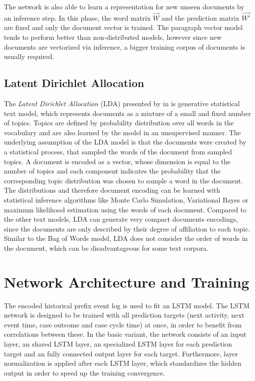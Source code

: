 The network is also able to learn a representation for new unseen documents by an inference step.
In this phase, the word matrix $\vec{W}$ and the prediction matrix $\vec{W'}$ are fixed and only the document vector is trained.
The paragraph vector model tends to perform better than non-distributed models, however since new documents are vectorized via inference, a bigger training corpus of documents is usually required.

\subsection{Latent Dirichlet Allocation}\label{sec:lda}

The \textit{Latent Dirichlet Allocation} (LDA) presented by \citeauthor{DBLP:journals/jmlr/BleiNJ03} in \citeyear{DBLP:journals/jmlr/BleiNJ03} \cite{DBLP:journals/jmlr/BleiNJ03} is generative statistical text model, which represents documents as a mixture of a small and fixed number of topics.
Topics are defined by probability distribution over all words in the vocabulary and are also learned by the model in an unsupervised manner.
The underlying assumption of the LDA model is that the documents were created by a statistical process, that sampled the words of the document from sampled topics.
A document is encoded as a vector, whose dimension is equal to the number of topics and each component indicates the probability that the corresponding topic distribution was chosen to sample a word in the document.
The distributions and therefore document encoding can be learned with statistical inference algorithms like Monte Carlo Simulation, Variational Bayes or maximum likelihood estimation using the words of each document.
Compared to the other text models, LDA can generate very compact documents encodings, since the documents are only described by their degree of affiliation to each topic.
Similar to the Bag of Words model, LDA does not consider the order of words in the document, which can be disadvantageous for some text corpora.

\section{Network Architecture and Training}

The encoded historical prefix event log is used to fit an LSTM model.
The LSTM network is designed to be trained with all prediction targets (next activity, next event time, case outcome and case cycle time) at once, in order to benefit from correlations between these.
In the basic variant, the network consists of an input layer, an shared LSTM layer, an specialized LSTM layer for each prediction target and an fully connected output layer for each target.
Furthermore, layer normalization \cite{DBLP:journals/corr/BaKH16} is applied after each LSTM layer, which standardizes the hidden output in order to speed up the training convergence.

